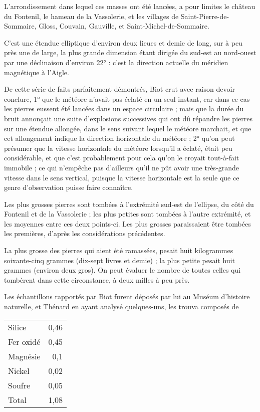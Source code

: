 \documentclass[a4paper, 12pt, oneside, french]{article}
\begin{document}
L'arrondissement dans lequel ces masses ont été lancées, a pour limites le château du Fontenil, le hameau de la Vassolerie, et les villages de Saint-Pierre-de-Sommaire, Gloss, Couvain, Gauville, et Saint-Michel-de-Sommaire.

C'est une étendue elliptique d'environ deux lieues et demie de long, sur à peu près une de large, la plus grande dimension étant dirigée du sud-est au nord-ouest par une déclinaison d'environ 22° : c'est la direction actuelle du méridien magnétique à l'Aigle.

De cette série de faits parfaitement démontrés, Biot crut avec raison devoir conclure, 1° que le météore n'avait pas éclaté en un seul instant, car dans ce cas les pierres eussent été lancées dans un espace circulaire ; mais que la durée du bruit annonçait une suite d'explosions successives qui ont dû répandre les pierres sur une étendue allongée, dans le sens suivant lequel le météore marchait, et que cet allongement indique la direction horizontale du météore ; 2° qu'on peut présumer que la vitesse horizontale du météore lorsqu'il a éclaté, était peu considérable, et que c'est probablement pour cela qu'on le croyait tout-à-fait immobile ; ce qui n'empêche pas d'ailleurs qu'il ne pût avoir une très-grande vitesse dans le sens vertical, puisque la vitesse horizontale est la seule que ce genre d'observation puisse faire connaître.

Les plus grosses pierres sont tombées à l'extrémité sud-est de l'ellipse, du côté du Fontenil et de la Vassolerie ; les plus petites sont tombées à l'autre extrémité, et les moyennes entre ces deux points-ci. Les plus grosses paraissaient être tombées les premières, d'après les considérations précédentes.

La plus grosse des pierres qui aient été ramassées, pesait huit kilogrammes soixante-cinq grammes (dix-sept livres et demie) ; la plus petite pesait huit grammes (environ deux gros). On peut évaluer le nombre de toutes celles qui tombèrent dans cette circonstance, à deux milles à peu près.

Les échantillons rapportés par Biot furent déposés par lui au Muséum d'histoire naturelle, et Thénard en ayant analysé quelques-uns, les trouva composés de
\begin{table}[H]
    \centering
    \Fontauri
    \large
    \begin{tabular}{l r}
        Silice & 0,46 \\
        Fer oxidé & 0,45 \\
        Magnésie & 0,1 \\
        Nickel & 0,02 \\
        Soufre & 0,05 \\ \hline
        Total & 1,08 \\
    \end{tabular}
\end{table}
\end{document}
